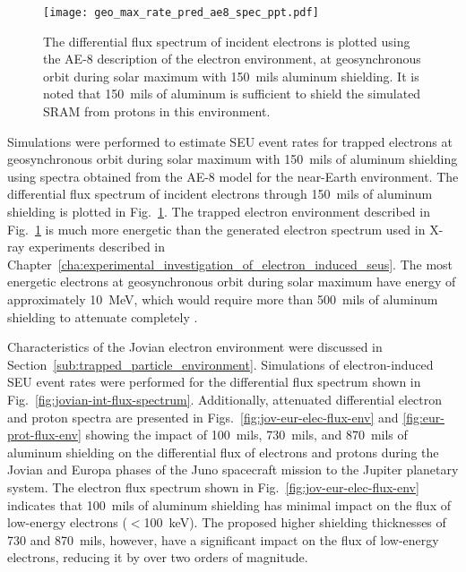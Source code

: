 \begin{figure}[htbp]
    \begin{center}
        \texttt{[image: geo\_max\_rate\_pred\_ae8\_spec\_ppt.pdf]}
    \end{center}
    \caption{The differential flux spectrum of incident electrons is plotted using the AE-8 description of the electron environment, at geosynchronous orbit during solar maximum with 150~mils aluminum shielding. It is noted that 150~mils of aluminum is sufficient to shield the simulated SRAM from protons in this environment.}
    \label{fig:ae8_spec_ppt}
\end{figure}

Simulations were performed to estimate SEU event rates for trapped electrons at geosynchronous orbit during solar maximum with 150~mils of aluminum shielding using spectra obtained from the AE-8 model for the near-Earth environment.
The differential flux spectrum of incident electrons through 150~mils of aluminum shielding is plotted in Fig.~\ref{fig:ae8_spec_ppt}.
The trapped electron environment described in Fig.~\ref{fig:ae8_spec_ppt} is much more energetic than the generated electron spectrum used in X-ray experiments described in Chapter~\ref{cha:experimental_investigation_of_electron_induced_seus}.
The most energetic electrons at geosynchronous orbit during solar maximum have energy of approximately 10~MeV, which would require more than 500~mils of aluminum shielding to attenuate completely \cite{Bourdarie:kj,Xapsos:2013cu}.

Characteristics of the Jovian electron environment were discussed in Section~\ref{sub:trapped_particle_environment}.
Simulations of electron-induced SEU event rates were performed for the differential flux spectrum shown in Fig.~\ref{fig:jovian-int-flux-spectrum}.
Additionally, attenuated differential electron and proton spectra are presented in Figs.~\ref{fig:jov-eur-elec-flux-env} and \ref{fig:eur-prot-flux-env} showing the impact of 100~mils, 730~mils, and 870~mils of aluminum shielding on the differential flux of electrons and protons during the Jovian and Europa phases of the Juno spacecraft mission to the Jupiter planetary system.
The electron flux spectrum shown in Fig.~\ref{fig:jov-eur-elec-flux-env} indicates that 100~mils of aluminum shielding has minimal impact on the flux of low-energy electrons ($<$100~keV).
The proposed higher shielding thicknesses of 730 and 870~mils, however, have a significant impact on the flux of low-energy electrons, reducing it by over two orders of magnitude.

